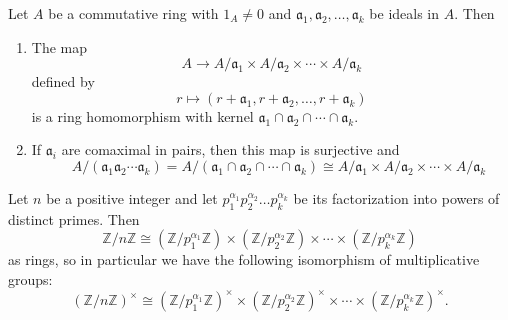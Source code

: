 \begin{theorem}
    Let $A$ be a commutative ring with $1_A\neq 0$ and $\mathfrak{a}_1, \mathfrak{a}_2, \ldots, \mathfrak{a}_k$ be ideals in $A$. Then
    \begin{enumerate}
        \item
              The map
              \begin{equation*}
                  A \rightarrow A / \mathfrak{a}_1 \times A / \mathfrak{a}_2 \times \cdots \times A / \mathfrak{a}_k
              \end{equation*}
              defined by
              \begin{equation*}
                  r \mapsto\left(r+\mathfrak{a}_1, r+\mathfrak{a}_2, \ldots, r+\mathfrak{a}_k\right)
              \end{equation*}
              is a ring homomorphism with kernel $\mathfrak{a}_1 \cap \mathfrak{a}_2 \cap \cdots \cap \mathfrak{a}_k$.

        \item
              If $\mathfrak{a}_i$ are comaximal in pairs, then this map is surjective and
              \begin{equation*}
                  \quad A /\left(\mathfrak{a}_1 \mathfrak{a}_2 \cdots \mathfrak{a}_k\right)=A /\left(\mathfrak{a}_1 \cap \mathfrak{a}_2 \cap \cdots \cap \mathfrak{a}_k\right) \cong A / \mathfrak{a}_1 \times A / \mathfrak{a}_2 \times \cdots \times A / \mathfrak{a}_k
              \end{equation*}
    \end{enumerate}
\end{theorem}

\begin{corollary}
    Let $n$ be a positive integer and let $p_1^{\alpha_1} p_2^{\alpha_2} \ldots p_k^{\alpha_k}$ be its factorization into powers of distinct primes. Then
    \begin{equation*}
        \mathbb{Z} / n \mathbb{Z}
        \cong
        \left(\mathbb{Z} / p_1^{\alpha_1} \mathbb{Z}\right) \times\left(\mathbb{Z} / p_2^{\alpha_2} \mathbb{Z}\right) \times \cdots \times\left(\mathbb{Z} / p_k^{\alpha_k} \mathbb{Z}\right)
    \end{equation*}
    as rings, so in particular we have the following isomorphism of multiplicative groups:
    \begin{equation*}
        (\mathbb{Z} / n \mathbb{Z})^{\times} \cong\left(\mathbb{Z} / p_1^{\alpha_1} \mathbb{Z}\right)^{\times} \times\left(\mathbb{Z} / p_2^{\alpha_2} \mathbb{Z}\right)^{\times} \times \cdots \times\left(\mathbb{Z} / p_k^{\alpha_k} \mathbb{Z}\right)^{\times} .
    \end{equation*}
\end{corollary}



